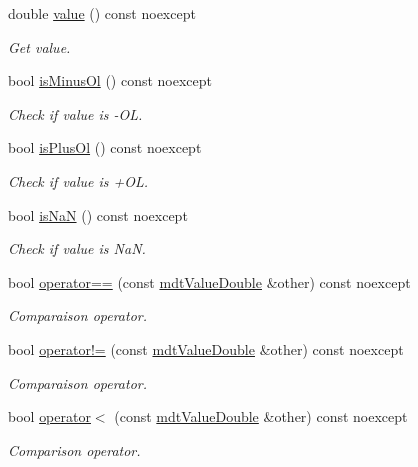 \begin{DoxyCompactItemize}
double \hyperlink{classmdt_value_double_a0cd139b92f5601b5c86f79374e918db4}{value} () const noexcept
\begin{DoxyCompactList}\small\item\em Get value. \end{DoxyCompactList}\item 
bool \hyperlink{classmdt_value_double_a858e2950ad9366be75f46abbd69a4093}{is\-Minus\-Ol} () const noexcept
\begin{DoxyCompactList}\small\item\em Check if value is -\/\-O\-L. \end{DoxyCompactList}\item 
bool \hyperlink{classmdt_value_double_ad4ba3bb4b58183483f7c275ff1ccbdb2}{is\-Plus\-Ol} () const noexcept
\begin{DoxyCompactList}\small\item\em Check if value is +\-O\-L. \end{DoxyCompactList}\item 
bool \hyperlink{classmdt_value_double_ac791c38df1159ba124b05c5d79b0f45e}{is\-Na\-N} () const noexcept
\begin{DoxyCompactList}\small\item\em Check if value is Na\-N. \end{DoxyCompactList}\item 
bool \hyperlink{classmdt_value_double_a39c1da52949d40d6d9d5fba4a461a26e}{operator==} (const \hyperlink{classmdt_value_double}{mdt\-Value\-Double} \&other) const noexcept
\begin{DoxyCompactList}\small\item\em Comparaison operator. \end{DoxyCompactList}\item 
bool \hyperlink{classmdt_value_double_a35af8353df4d2cd04e5f0afad1437431}{operator!=} (const \hyperlink{classmdt_value_double}{mdt\-Value\-Double} \&other) const noexcept
\begin{DoxyCompactList}\small\item\em Comparaison operator. \end{DoxyCompactList}\item 
bool \hyperlink{classmdt_value_double_a186471fbe255989e489374fddb5ff9be}{operator$<$} (const \hyperlink{classmdt_value_double}{mdt\-Value\-Double} \&other) const noexcept
\begin{DoxyCompactList}\small\item\em Comparison operator. \end{DoxyCompactList}\item 

\end{DoxyCompactItemize}
